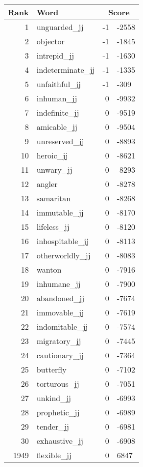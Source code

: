 \begin{longtable}[!htbp]{| rlr@{.}l |}
    \hline
    \textbf{Rank} & \textbf{Word} & \multicolumn{2}{c|}{\textbf{Score}} \\
    \hline
    \endhead
    1 & unguarded\_jj & -1 & -2558 \\
    2 & objector & -1 & -1845 \\
    3 & intrepid\_jj & -1 & -1630 \\
    4 & indeterminate\_jj & -1 & -1335 \\
    5 & unfaithful\_jj & -1 & -309 \\
    6 & inhuman\_jj & 0 & -9932 \\
    7 & indefinite\_jj & 0 & -9519 \\
    8 & amicable\_jj & 0 & -9504 \\
    9 & unreserved\_jj & 0 & -8893 \\
    10 & heroic\_jj & 0 & -8621 \\
    11 & unwary\_jj & 0 & -8293 \\
    12 & angler & 0 & -8278 \\
    13 & samaritan & 0 & -8268 \\
    14 & immutable\_jj & 0 & -8170 \\
    15 & lifeless\_jj & 0 & -8120 \\
    16 & inhospitable\_jj & 0 & -8113 \\
    17 & otherworldly\_jj & 0 & -8083 \\
    18 & wanton & 0 & -7916 \\
    19 & inhumane\_jj & 0 & -7900 \\
    20 & abandoned\_jj & 0 & -7674 \\
    21 & immovable\_jj & 0 & -7619 \\
    22 & indomitable\_jj & 0 & -7574 \\
    23 & migratory\_jj & 0 & -7445 \\
    24 & cautionary\_jj & 0 & -7364 \\
    25 & butterfly & 0 & -7102 \\
    26 & torturous\_jj & 0 & -7051 \\
    27 & unkind\_jj & 0 & -6993 \\
    28 & prophetic\_jj & 0 & -6989 \\
    29 & tender\_jj & 0 & -6981 \\
    30 & exhaustive\_jj & 0 & -6908 \\
    1949 & flexible\_jj & 0 & 6847 \\

\end{longtable}
